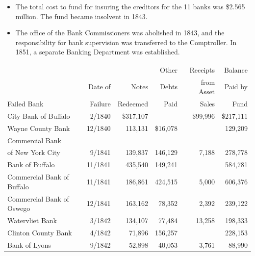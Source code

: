 \documentclass[11pt]{article}
\newcommand{\STRUT}{\rule{0in}{3ex}}
\begin{document}
\begin{itemize}
\item The total cost to fund for insuring the creditors for the 11 
banks was \$2.565 million.   The fund became insolvent in 1843.

\item The office of the Bank Commissioners was abolished in 1843, and the 
responsibility for bank supervision was transferred to the Comptroller. In 1851, a 
separate Banking Department was established.

\end{itemize}



\begin{table}[htbp]
\centering
\small
\begin{tabular}{lrrrrr}
                               &             &               &   Other      &  Receipts     &  Balance  \\
                               & Date of     & Notes         &   Debts      &  from Asset   &  Paid by \\
Failed Bank                    & Failure     & Redeemed      &   Paid       &  Sales        &   Fund \\
\hline
City Bank of Buffalo           & 2/1840      & \$317,107 &           & \$99,996 & \$217,111 \STRUT \\
Wayne County Bank              & 12/1840     &   113,131   &  \$16,078 &          & 129,209 \\
Commercial Bank \\
\hspace{.1in} of New York City & 9/1841      & 139,837   & 146,129   &  7,188   & 278,778 \\
Bank of Buffalo                & 11/1841     & 435,540   & 149,241   &          & 584,781 \\
Commercial Bank 
\hspace{.1in} of Buffalo       & 11/1841     & 186,861   & 424,515   &  5,000   & 606,376 \\
Commercial Bank 
\hspace{.1in} of Oswego        & 12/1841     & 163,162   &  78,352   &  2,392   & 239,122 \\
Watervliet Bank                & 3/1842      & 134,107   &  77,484   & 13,258   & 198,333 \\
Clinton County Bank            & 4/1842      &  71,896   & 156,257   &          & 228,153 \\
Bank of Lyons                  & 9/1842      &  52,898   & 40,053    &  3,761   &  88,990 \\

\end{tabular}
\end{table}
\end{document}

